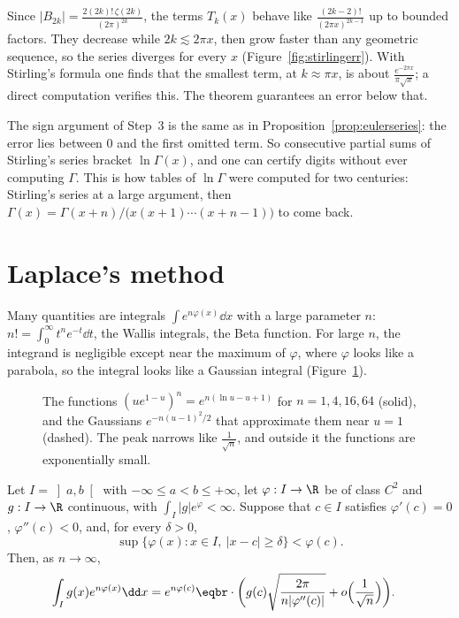 Since $|B_{2k}|=\frac{2(2k)!\,\zeta(2k)}{(2\pi)^{2k}}$, the terms $T_k(x)$ behave like $\frac{(2k-2)!}{(2\pi x)^{2k-1}}$ up to bounded factors. They decrease while
$2k\lesssim2\pi x$, then grow faster than any geometric sequence, so the series diverges for every $x$ (Figure~\ref{fig:stirlingerr}). With Stirling's
formula one finds that the smallest term, at $k\approx\pi x$, is about $\frac{e^{-2\pi x}}{\pi\sqrt x}$; a direct computation verifies this. The theorem guarantees
an error below that.

\begin{beauty}
The sign argument of Step~3 is the same as in Proposition~\ref{prop:eulerseries}: the error lies between $0$ and the first omitted term. So
consecutive partial sums of Stirling's series bracket $\ln\Gamma(x)$, and one can certify digits without ever computing $\Gamma$. This is how
tables of $\ln\Gamma$ were computed for two centuries: Stirling's series at a large argument, then $\Gamma(x)=\Gamma(x+n)/\bigl(x(x+1)\cdots(x+n-1)\bigr)$ to come back.
\end{beauty}

\section{Laplace's method}

Many quantities are integrals $\int e^{n\varphi(x)}\dd x$ with a large parameter $n$: $n!=\int_0^\infty t^ne^{-t}\dd t$, the Wallis integrals, the Beta function.
For large $n$, the integrand is negligible except near the maximum of $\varphi$, where $\varphi$ looks like a parabola, so the integral looks like a Gaussian
integral (Figure~\ref{fig:laplace}).

\begin{figure}[ht]
\centering
{}
\caption{The functions $(ue^{1-u})^n=e^{n(\ln u-u+1)}$ for $n=1,4,16,64$ (solid), and the Gaussians $e^{-n(u-1)^2/2}$ that approximate them near $u=1$
(dashed). The peak narrows like $\frac1{\sqrt n}$, and outside it the functions are exponentially small.}
\label{fig:laplace}
\end{figure}

\begin{theorem}\label{thm:laplace}
Let $I=\left]a,b\right[$ with $-\infty\le a<b\le+\infty$, let $\varphi:I\to\R$ be of class $C^2$ and $g:I\to\R$ continuous, with $\int_I|g|e^\varphi<\infty$.
Suppose that $c\in I$ satisfies $\varphi'(c)=0$, $\varphi''(c)<0$, and, for every $\delta>0$,
\[
\sup\bigl\{\varphi(x):x\in I,\ |x-c|\ge\delta\bigr\}<\varphi(c).
\]
Then, as $n\to\infty$,
\[
\begin{aligned}\int_Ig(x)e^{n\varphi(x)}\dd x&=e^{n\varphi(c)}\eqbr\cdot\biggl(g(c)\sqrt{\frac{2\pi}{n|\varphi''(c)|}}+o\Bigl(\frac1{\sqrt n}\Bigr)\biggr).\end{aligned}
\]
\end{theorem}

